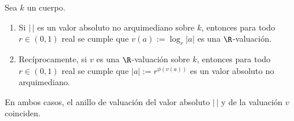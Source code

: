\documentclass[teoria-numeros.tex]{subfiles}
\begin{document}
\begin{thm}
	Sea $k$ un cuerpo.
	\begin{enumerate}
		\item Si $|\,|$ es un valor absoluto no arquimediano sobre $k$, entonces para todo $r \in (0, 1)$ real se cumple que
			$v(a) := \log_r|a|$ es una $\R$-valuación.
		\item Recíprocamente, si $v$ es una $\R$-valuación sobre $k$, entonces para todo $r \in (0, 1)$ real se cumple que $|a| := r^{\phi(v(a))}$
			es un valor absoluto no arquimediano.
	\end{enumerate}
	En ambos casos, el anillo de valuación del valor absoluto $|\,|$ y de la valuación $v$ coinciden.
\end{thm}



\end{document}

